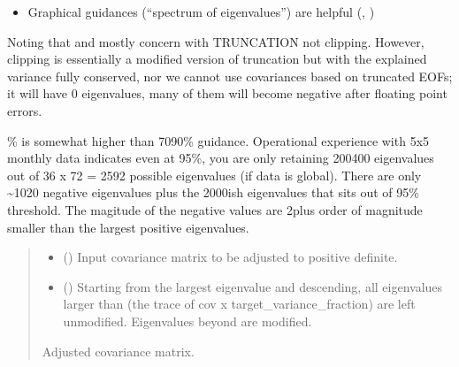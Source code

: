 \documentclass[letterpaper,10pt,english]{sphinxmanual}
\begin{document}
\begin{fulllineitems}
\begin{itemize}
\item {}
\sphinxAtStartPar
Graphical guidances (“spectrum of eigenvalues”) are helpful (,
)

\end{itemize}

\sphinxAtStartPar
Noting that  and  mostly concern with TRUNCATION not
clipping. However, clipping is essentially a modified version of
truncation but with the explained variance fully conserved, nor
we cannot use covariances based on truncated EOFs; it will have 0
eigenvalues, many of them will become negative after floating point
errors.

\% is somewhat higher than  70\sphinxhyphen{}90\% guidance. Operational
experience with 5x5 monthly data indicates even at 95\%, you are
only retaining 200\sphinxhyphen{}400 eigenvalues out of 36 x 72 = 2592 possible
eigenvalues (if data is global). There are only \textasciitilde{}10\sphinxhyphen{}20 negative eigenvalues
plus the 2000\sphinxhyphen{}ish eigenvalues that sits out of 95\% threshold. The magitude
of the negative values are 2\sphinxhyphen{}plus order of magnitude smaller than the
largest positive eigenvalues.
\begin{quote}\begin{description}
\begin{itemize}
\item {}
\sphinxAtStartPar
{} () \textendash{} Input covariance matrix to be adjusted to positive definite.

\item {}
\sphinxAtStartPar
{} () \textendash{} Starting from the largest eigenvalue and descending, all eigenvalues
larger than (the trace of cov x target\_variance\_fraction) are left
unmodified. Eigenvalues beyond are modified.

\end{itemize}

\sphinxAtStartPar
Adjusted covariance matrix.

\sphinxAtStartPar
{}


\end{description}
\end{quote}
\end{fulllineitems}
\end{document}
